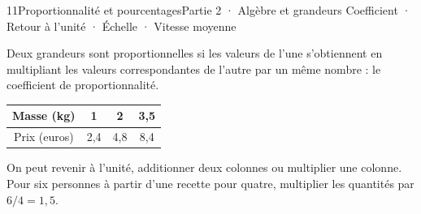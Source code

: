 \begin{ouverture}[calcul]{11}{Proportionnalité et pourcentages}{Partie 2 · Algèbre et grandeurs}
{Coefficient · Retour à l’unité · Échelle · Vitesse moyenne}
\end{ouverture}
\pagestyle{otMain}\essentiel\fontsize{11}{15}\selectfont
{}\label{cours-11-1}
\begin{definition}Deux grandeurs sont proportionnelles si les valeurs de l’une s’obtiennent en multipliant les valeurs correspondantes de l’autre par un même nombre : le coefficient de proportionnalité.\end{definition}
\begin{center}\renewcommand{\arraystretch}{1.35}\begin{tabular}{c|ccc}\toprule
Masse (kg) & 1 & 2 & 3,5\\\midrule
Prix (euros) & 2,4 & 4,8 & 8,4\\
\bottomrule\end{tabular}\end{center}
\begin{savoirfaire}On peut revenir à l’unité, additionner deux colonnes ou multiplier une colonne. Pour six personnes à partir d’une recette pour quatre, multiplier les quantités par $6/4=1{,}5$.\end{savoirfaire}
\label{fig-cours-11-1-cours-proportion}

